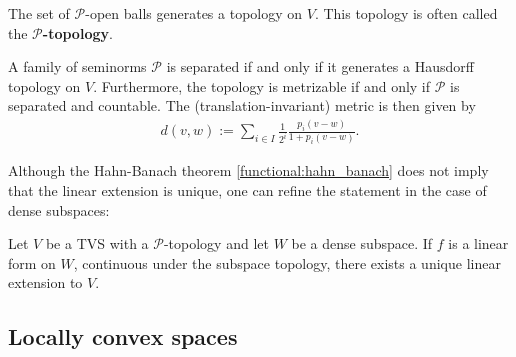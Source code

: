     \begin{property}
        The set of $\mathscr{P}$-open balls generates a topology on $V$. This topology is often called the \textbf{$\mathscr{P}$-topology}.
    \end{property}
    \begin{property}\label{functional:separated_metric}
        A family of seminorms $\mathcal{P}$ is separated if and only if it generates a Hausdorff topology on $V$. Furthermore, the topology is metrizable if and only if $\mathcal{P}$ is separated and countable. The (translation-invariant) metric is then given by
        \begin{gather}
            d(v,w) := \sum_{i\in I}\frac{1}{2^i}\frac{p_i(v-w)}{1 + p_i(v-w)}.
        \end{gather}
    \end{property}

    Although the Hahn-Banach theorem \ref{functional:hahn_banach} does not imply that the linear extension is unique, one can refine the statement in the case of dense subspaces:
    \begin{result}
        Let $V$ be a TVS with a $\mathscr{P}$-topology and let $W$ be a dense subspace. If $f$ is a linear form on $W$, continuous under the subspace topology, there exists a unique linear extension to $V$.
    \end{result}

\subsection{Locally convex spaces}

